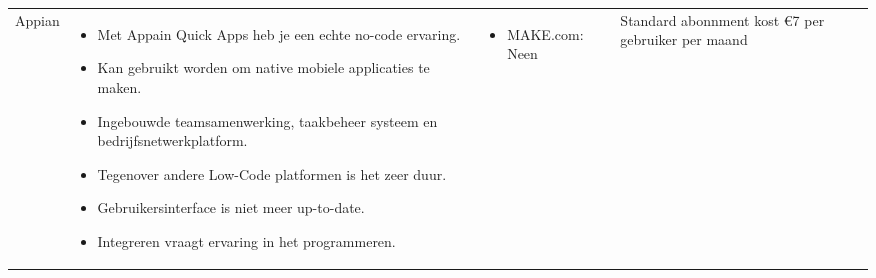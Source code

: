 \begin{longtable}{p{2.5cm} p{5.5cm} p{3.5cm} p{2.5cm}}
    Appian & 
    \vspace{-\topsep}\vspace{-\partopsep} 
    \begin{itemize}[leftmargin=2pt, topsep=0pt,parsep=0pt,noitemsep]
        \item[] Met Appain Quick Apps heb je een echte no-code ervaring.
        \item[] Kan gebruikt worden om native mobiele applicaties te maken.
        \item[] Ingebouwde teamsamenwerking, taakbeheer systeem en bedrijfsnetwerkplatform.
    \end{itemize} 
    \begin{itemize}[leftmargin=2pt, topsep=8pt,parsep=0pt,noitemsep]
        \item[] Tegenover andere Low-Code platformen is het zeer duur.
        \item[] Gebruikersinterface is niet meer up-to-date. 
        \item[] Integreren vraagt ervaring in het programmeren.
    \end{itemize} &
    \vspace{-\topsep}\vspace{-\partopsep} 
    \begin{itemize}[leftmargin=2pt, topsep=0pt,parsep=0pt,noitemsep]
        \item[]  MAKE.com: Neen
    \end{itemize}
    &
    Standard abonnment kost €7 per gebruiker per maand\\


\end{longtable}
